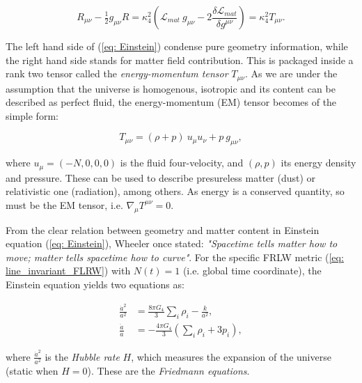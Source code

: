 \documentclass[11pt, a4paper]{article} %
\begin{document}
\begin{equation}\label{eq: Einstein}
		R_{\mu\nu} - \tfrac{1}{2} g_{\mu\nu} R = \kappa^{2}_{4} \left(\mathcal{L}_{mat}\: g_{\mu\nu} - 2 \frac{\delta \mathcal{L}_{mat}}{\delta g^{\mu \nu}}\right) = \kappa^{2}_{4} T_{\mu \nu}.
\end{equation}

The left hand side of (\ref{eq: Einstein}) condense pure geometry information, while the right hand side stands for matter field contribution. This is packaged inside a rank two tensor called the \textit{energy-momentum tensor} $T_{\mu\nu}$. As we are under the assumption that the universe is homogenous, isotropic and its content can be described as perfect fluid, the energy-momentum (EM) tensor becomes of the simple form:

\begin{equation}\label{eq: EMtensor}
	T_{\mu \nu} = (\rho + p) \:u_{\mu}u_{\nu} + p\: g_{\mu\nu},
\end{equation}

where $u_{\mu} = \left(-N, 0, 0, 0\right)$ is the fluid four-velocity, and $(\rho, p)$ its energy density and pressure. These can be used to describe presureless matter (dust) or relativistic one (radiation), among others. As energy is a conserved quantity, so must be the EM tensor, i.e. $\nabla_{\mu}T^{\mu \nu} =0$. 

From the clear relation between geometry and matter content in Einstein equation (\ref{eq: Einstein}), Wheeler once stated: \textit{"Spacetime tells matter how to move; matter tells spacetime how to curve"}. For the specific FRLW metric (\ref{eq: line_invariant_FLRW}) with $N(t) = 1$ (i.e. global time coordinate), the Einstein equation yields two equations as:

\begin{align}
	\label{eq: Friedmann1} \frac{\dot{a}^{2}}{a^{2}} &= \frac{8 \pi G_{4}}{3}\sum_{i} \rho_{i} - \frac{k}{a^{2}},\\
	\label{eq: Friedmann2} \frac{\ddot{a}}{a} &= -\frac{4 \pi G_{4}}{3} \left(\sum_{i} \rho_{i} + 3 p_{i}\right),
\end{align}

where $\frac{\dot{a}^{2}}{a^{2}}$ is the \textit{Hubble rate} $H$, which measures the expansion of the universe (static when $H = 0$). These are the \textit{Friedmann equations}.
\end{document}
